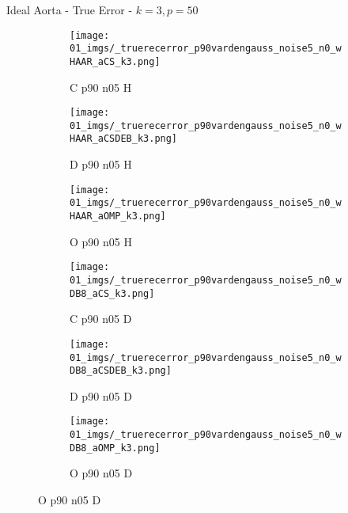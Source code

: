 \begin{frame}{Ideal Aorta - True Error - $k=3,p=50$}{}
\begin{figure}
\begin{subfigure}{0.13\textwidth}
\texttt{[image: 01\_imgs/\_truerecerror\_p90vardengauss\_noise5\_n0\_wHAAR\_aCS\_k3.png]}
\caption*{\tiny C p90 n05 H}
\end{subfigure}
\begin{subfigure}{0.13\textwidth}
\texttt{[image: 01\_imgs/\_truerecerror\_p90vardengauss\_noise5\_n0\_wHAAR\_aCSDEB\_k3.png]}
\caption*{\tiny D p90 n05 H}
\end{subfigure}
\begin{subfigure}{0.13\textwidth}
\texttt{[image: 01\_imgs/\_truerecerror\_p90vardengauss\_noise5\_n0\_wHAAR\_aOMP\_k3.png]}
\caption*{\tiny O p90 n05 H}
\end{subfigure}
\begin{subfigure}{0.13\textwidth}
\texttt{[image: 01\_imgs/\_truerecerror\_p90vardengauss\_noise5\_n0\_wDB8\_aCS\_k3.png]}
\caption*{\tiny C p90 n05 D}
\end{subfigure}
\begin{subfigure}{0.13\textwidth}
\texttt{[image: 01\_imgs/\_truerecerror\_p90vardengauss\_noise5\_n0\_wDB8\_aCSDEB\_k3.png]}
\caption*{\tiny D p90 n05 D}
\end{subfigure}
\begin{subfigure}{0.13\textwidth}
\texttt{[image: 01\_imgs/\_truerecerror\_p90vardengauss\_noise5\_n0\_wDB8\_aOMP\_k3.png]}
\caption*{\tiny O p90 n05 D}
\end{subfigure}

\vspace{5pt}


\end{figure}
\end{frame}
